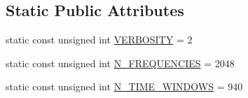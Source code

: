 \subsection*{Static Public Attributes}
\begin{DoxyCompactItemize}
\item 
static const unsigned int \mbox{\hyperlink{classAudioInput_aff0f7df20d558ba13f85b3d49b7f42b2}{V\+E\+R\+B\+O\+S\+I\+TY}} = 2
\item 
static const unsigned int \mbox{\hyperlink{classAudioInput_a4be6c19fca6626b2ccee1eeca458f7c8}{N\+\_\+\+F\+R\+E\+Q\+U\+E\+N\+C\+I\+ES}} = 2048
\item 
static const unsigned int \mbox{\hyperlink{classAudioInput_a8b6b39b0558d7db54234f1e39a38a775}{N\+\_\+\+T\+I\+M\+E\+\_\+\+W\+I\+N\+D\+O\+WS}} = 940
\end{DoxyCompactItemize}
